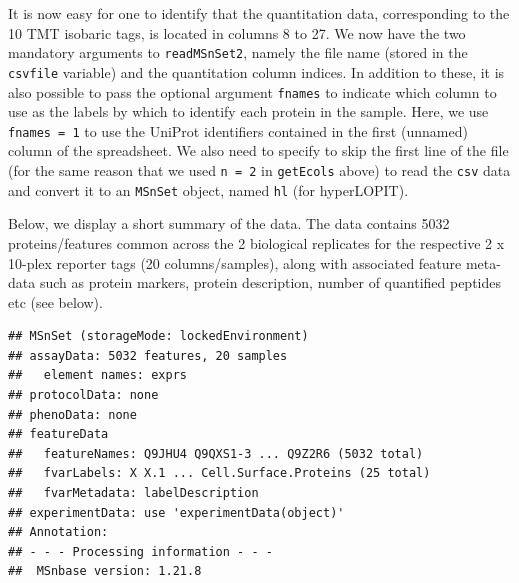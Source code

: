 It is now easy for one to identify that the quantitation data,
corresponding to the 10 TMT isobaric tags, is located in columns 8
to 27. We now have the two mandatory arguments to \texttt{readMSnSet2},
namely the file name (stored in the \texttt{csvfile} variable) and the
quantitation column indices. In addition to these, it is also possible
to pass the optional argument \texttt{fnames} to indicate which column to use
as the labels by which to identify each protein in the sample. Here,
we use \texttt{fnames = 1} to use the UniProt identifiers contained in the
first (unnamed) column of the spreadsheet. We also need to specify to
skip the first line of the file (for the same reason that we used 
\texttt{n = 2} in \texttt{getEcols} above) to read the \texttt{csv} data and convert it to an
\texttt{MSnSet} object, named \texttt{hl} (for hyperLOPIT).

\begin{knitrout}
\color{fgcolor}\begin{kframe}
\begin{alltt}
 \hlkwb{<-}   \hlstd{=} \hlopt{:}\hlstd{,}  \hlstd{=} \hlstd{,}  \hlstd{=} \hlstd{)}
\end{alltt}
\end{kframe}
\end{knitrout}

Below, we display a short summary of the data. The data contains 
5032 proteins/features common across the 2 biological replicates
for the respective 2 x 10-plex reporter tags (20
columns/samples), along with associated feature meta-data such as
protein markers, protein description, number of quantified peptides
etc (see below).


\begin{knitrout}
\color{fgcolor}\begin{kframe}
\begin{alltt}
\end{alltt}
\begin{verbatim}
## MSnSet (storageMode: lockedEnvironment)
## assayData: 5032 features, 20 samples 
##   element names: exprs 
## protocolData: none
## phenoData: none
## featureData
##   featureNames: Q9JHU4 Q9QXS1-3 ... Q9Z2R6 (5032 total)
##   fvarLabels: X X.1 ... Cell.Surface.Proteins (25 total)
##   fvarMetadata: labelDescription
## experimentData: use 'experimentData(object)'
## Annotation:  
## - - - Processing information - - -
##  MSnbase version: 1.21.8
\end{verbatim}
\end{kframe}
\end{knitrout}

